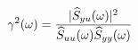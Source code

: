 \documentclass[preview]{standalone}
\begin{document}
\begin{align*}
\special{dvisvgm:raw <g id='unique000'>}\gamma^2(\omega)=\frac{|\widehat{S}_{yu}(\omega)|^2}{\widehat{S}_{uu}(\omega)\widehat{S}_{yy}(\omega)}\special{dvisvgm:raw </g>}
\end{align*}
\end{document}
